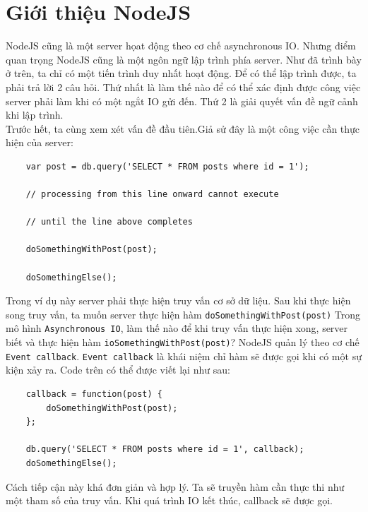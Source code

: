 \section{Giới thiệu NodeJS}
	NodeJS cũng là một server họat động theo cơ chế asynchronous IO. Nhưng điểm quan trọng NodeJS cũng là một ngôn ngữ lập trình phía server. Như đã trình bày ở trên, ta chỉ có một tiến trình duy nhất hoạt động. Để có thể lập trình được, ta phải trả lời 2 câu hỏi. Thứ nhất là làm thế nào để có thể xác định được công việc server phải làm khi có một ngắt IO gửi đến. Thứ 2 là giải quyết vấn đề ngữ cảnh khi lập trình.\\
	Trước hết, ta cùng xem xét vấn đề đầu tiên.Giả sử đây là một công việc cần thực hiện của server:
\begin{verbatim}
	var post = db.query('SELECT * FROM posts where id = 1');

	// processing from this line onward cannot execute

	// until the line above completes

	doSomethingWithPost(post);

	doSomethingElse();
\end{verbatim}
	Trong ví dụ này server phải thực hiện truy vấn cơ sở dữ liệu. Sau khi thực hiện song truy vấn, ta muốn server thực hiện hàm \texttt{doSomethingWithPost(post)} Trong mô hình \texttt{Asynchronous IO}, làm thế nào để khi truy vấn thực hiện xong, server biết và thực hiện hàm \texttt{ioSomethingWithPost(post)}? NodeJS quản lý theo cơ chế \texttt{Event callback}. \texttt{Event callback} là khái niệm chỉ hàm sẽ được gọi khi có một sự kiện xảy ra.
	Code trên có thể được viết lại như sau:
\begin{verbatim}
	callback = function(post) {
		doSomethingWithPost(post);
	};

	db.query('SELECT * FROM posts where id = 1', callback);
	doSomethingElse();
\end{verbatim}
	Cách tiếp cận này khá đơn giản và hợp lý. Ta sẽ truyền hàm cần thực thi như một tham số của truy vấn. Khi quá trình IO kết thúc, callback sẽ được gọi.

